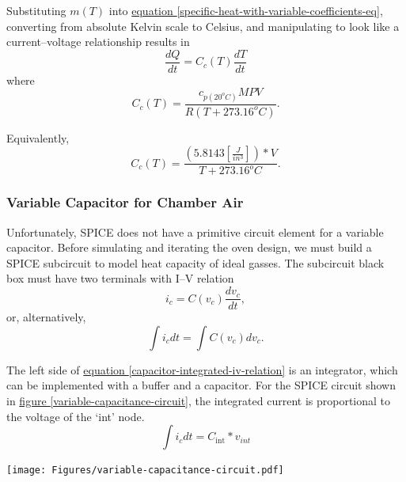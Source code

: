 \documentclass[10pt, twocolumn]{article}
\begin{document}
Substituting $m(T)$ into
\hyperref[specific-heat-with-variable-coefficients-eq]
{equation \ref{specific-heat-with-variable-coefficients-eq}},
converting from absolute Kelvin scale to Celsius, and
manipulating to look like a current--voltage relationship results in
\begin{equation}
\frac{dQ}{dt}=C_{c}(T)\frac{dT}{dt}
\end{equation}
where
\begin{equation}
C_{c}(T)=\frac{c_{p(20^{o}C)}MPV}{R(T+273.16^{o}C)}.
\label{bulk-air-capacitance-eq}
\end{equation}

Equivalently,
\begin{equation*}
C_{c}(T)=\frac{\left(5.8143\left[\frac{J}{in^{3}}\right]\right)*V}{T+273.16^{o}C}.
\end{equation*}

\subsubsection*{Variable Capacitor for Chamber Air}

Unfortunately, SPICE does not have a primitive circuit element for
a variable capacitor.
Before simulating and iterating the oven design, we must build a
SPICE subcircuit to model heat capacity of ideal gasses.
The subcircuit black box must have two terminals with I--V relation
\begin{equation*}
i_{c}=C(v_{c})\frac{dv_{c}}{dt},
\label{capacitor-iv-relation}
\end{equation*}
or, alternatively,
\begin{equation}
\int i_{c}dt=\int C(v_{c})dv_{c}.
\label{capacitor-integrated-iv-relation}
\end{equation}

The left side of \hyperref[capacitor-integrated-iv-relation]
{equation \ref{capacitor-integrated-iv-relation}} is an integrator,
which can be implemented with a buffer and a capacitor.
For the SPICE circuit shown in
\hyperref[variable-capacitance-circuit]{figure \ref{variable-capacitance-circuit}},
the integrated current is proportional to the voltage of
the `int' node.
\begin{equation*}
\int i_{c}dt=C_{\textrm{int}}*v_{int}
\end{equation*}

\begin{center}
	\texttt{[image: Figures/variable-capacitance-circuit.pdf]}
	\label{variable-capacitance-circuit}
\end{center}
\end{document}
